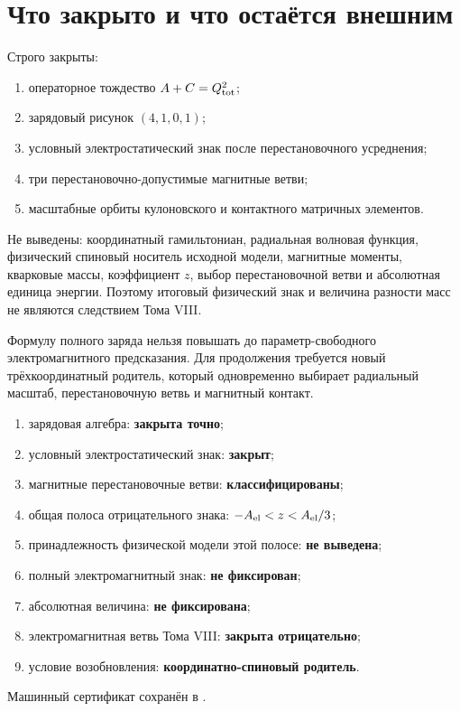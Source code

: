\section{Что закрыто и что остаётся внешним}

Строго закрыты:
\begin{enumerate}
 \item операторное тождество $A+C=Q_{\rm tot}^2$;
 \item зарядовый рисунок $(4,1,0,1)$;
 \item условный электростатический знак после перестановочного усреднения;
 \item три перестановочно-допустимые магнитные ветви;
 \item масштабные орбиты кулоновского и контактного матричных элементов.
\end{enumerate}

Не выведены: координатный гамильтониан, радиальная волновая функция,
физический спиновый носитель исходной модели, магнитные моменты, кварковые
массы, коэффициент $z$, выбор перестановочной ветви и абсолютная единица
энергии. Поэтому итоговый физический знак и величина разности масс не
являются следствием Тома VIII.

\begin{nogocriterion}
Формулу полного заряда нельзя повышать до параметр-свободного
электромагнитного предсказания. Для продолжения требуется новый
трёхкоординатный родитель, который одновременно выбирает радиальный
масштаб, перестановочную ветвь и магнитный контакт.
\end{nogocriterion}

\begin{protocol}
\begin{enumerate}
 \item зарядовая алгебра: \textbf{закрыта точно};
 \item условный электростатический знак: \textbf{закрыт};
 \item магнитные перестановочные ветви: \textbf{классифицированы};
 \item общая полоса отрицательного знака:
       \textbf{$-A_{\rm el}<z<A_{\rm el}/3$};
 \item принадлежность физической модели этой полосе: \textbf{не выведена};
 \item полный электромагнитный знак: \textbf{не фиксирован};
 \item абсолютная величина: \textbf{не фиксирована};
 \item электромагнитная ветвь Тома VIII: \textbf{закрыта отрицательно};
 \item условие возобновления: \textbf{координатно-спиновый родитель}.
\end{enumerate}
\end{protocol}

Машинный сертификат сохранён в
.